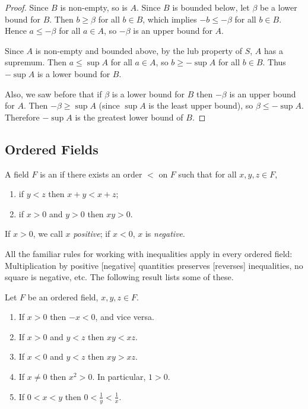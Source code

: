 \begin{proof}
Since $B$ is non-empty, so is $A$. Since $B$ is bounded below, let $\beta$ be a lower bound for $B$. Then $b\ge\beta$ for all $b\in B$, which implies $-b\le-\beta$ for all $b\in B$. Hence $a\le-\beta$ for all $a\in A$, so $-\beta$ is an upper bound for $A$.

Since $A$ is non-empty and bounded above, by the lub property of $S$, $A$ has a supremum. Then $a\le\sup A$ for all $a\in A$, so $b\ge-\sup A$ for all $b\in B$. Thus $-\sup A$ is a lower bound for $B$.

Also, we saw before that if $\beta$ is a lower bound for $B$ then $-\beta$ is an upper bound for $A$. Then $-\beta \ge \sup A$ (since $\sup A$ is the least upper bound), so $\beta \le -\sup A$. Therefore $-\sup A$ is the greatest lower bound of $B$.
\end{proof}
\pagebreak

\subsection{Ordered Fields}
\begin{definition}
A field $F$ is an  if there exists an order $<$ on $F$ such that for all $x,y,z\in F$,
\begin{enumerate}[label=(\roman*)]
\item if $y<z$ then $x+y<x+z$;
\item if $x>0$ and $y>0$ then $xy>0$.
\end{enumerate}
\end{definition}

If $x>0$, we call $x$ \emph{positive}; if $x<0$, $x$ is \emph{negative}.

All the familiar rules for working with inequalities apply in every ordered field: Multiplication by positive [negative] quantities preserves [reverses] inequalities, no square is negative, etc. The following result lists some of these. 

\begin{lemma}\label{lemma:ordered-field-properties}
Let $F$ be an ordered field, $x,y,z\in F$.
\begin{enumerate}[label=(\roman*)]
\item If $x>0$ then $-x<0$, and vice versa.
\item If $x>0$ and $y<z$ then $xy<xz$.
\item If $x<0$ and $y<z$ then $xy>xz$.
\item If $x\neq0$ then $x^2>0$. In particular, $1>0$.
\item If $0<x<y$ then $0<\frac{1}{y}<\frac{1}{x}$.
\end{enumerate}
\end{lemma}

